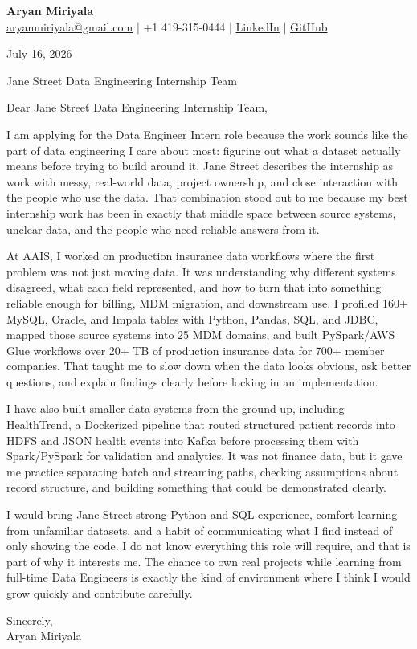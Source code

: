 \documentclass[letterpaper,11pt]{article}
\begin{document}
{\Large\textbf{Aryan Miriyala}}\\
\href{mailto:aryanmiriyala@gmail.com}{aryanmiriyala@gmail.com} $|$ +1 419-315-0444 $|$
\href{https://www.linkedin.com/in/aryan-miriyala-7788a21b6/}{LinkedIn} $|$
\href{https://github.com/aryanmiriyala}{GitHub}

July 16, 2026

Jane Street Data Engineering Internship Team

Dear Jane Street Data Engineering Internship Team,

I am applying for the Data Engineer Intern role because the work sounds like the part of data engineering I care about most: figuring out what a dataset actually means before trying to build around it. Jane Street describes the internship as work with messy, real-world data, project ownership, and close interaction with the people who use the data. That combination stood out to me because my best internship work has been in exactly that middle space between source systems, unclear data, and the people who need reliable answers from it.

At AAIS, I worked on production insurance data workflows where the first problem was not just moving data. It was understanding why different systems disagreed, what each field represented, and how to turn that into something reliable enough for billing, MDM migration, and downstream use. I profiled 160+ MySQL, Oracle, and Impala tables with Python, Pandas, SQL, and JDBC, mapped those source systems into 25 MDM domains, and built PySpark/AWS Glue workflows over 20+ TB of production insurance data for 700+ member companies. That taught me to slow down when the data looks obvious, ask better questions, and explain findings clearly before locking in an implementation.

I have also built smaller data systems from the ground up, including HealthTrend, a Dockerized pipeline that routed structured patient records into HDFS and JSON health events into Kafka before processing them with Spark/PySpark for validation and analytics. It was not finance data, but it gave me practice separating batch and streaming paths, checking assumptions about record structure, and building something that could be demonstrated clearly.

I would bring Jane Street strong Python and SQL experience, comfort learning from unfamiliar datasets, and a habit of communicating what I find instead of only showing the code. I do not know everything this role will require, and that is part of why it interests me. The chance to own real projects while learning from full-time Data Engineers is exactly the kind of environment where I think I would grow quickly and contribute carefully.

Sincerely,\\
Aryan Miriyala
\end{document}
